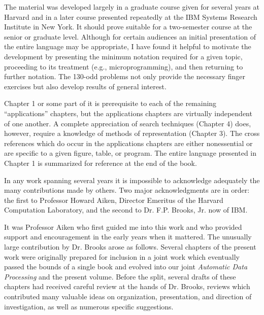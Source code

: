 \par The material was developed largely in a graduate course given for several years at Harvard and in a later course presented repeatedly at the IBM Systems Research Institute in New York. It should prove suitable for a two-semester course at the senior or graduate level. Although for certain audiences an initial presentation of the entire language may be appropriate, I have found it helpful to motivate the development by presenting the minimum notation required for a given topic, proceeding to its treatment (e.g., microprogramming), and then returning to further notation. The 130-odd problems not only provide the necessary finger exercises but also develop results of general interest.

\par Chapter 1 or some part of it is prerequisite to each of the remaining ``applications'' chapters, but the applications chapters are virtually independent of one another. A complete appreciation of search techniques (Chapter 4) does, however, require a knowledge of methods of representation (Chapter 3). The cross references which do occur in the applications chapters are either nonessential or are specific to a given figure, table, or program. The entire language presented in Chapter 1 is summarized for reference at the end of the book.

\par In any work spanning several years it is impossible to acknowledge adequately the many contributions made by others. Two major acknowledgments are in order: the first to Professor Howard Aiken, Director Emeritus of the Harvard Computation Laboratory, and the second to Dr. F.P. Brooks, Jr. now of IBM.

\par It was Professor Aiken who first guided me into this work and who provided support and encouragement in the early years when it mattered. The unusually large contribution by Dr. Brooks arose as follows. Several chapters of the present work were originally prepared for inclusion in a joint work which eventually passed the bounds of a single book and evolved into our joint \textit{Automatic Data Processing} and the present volume. Before the split, several drafts of these chapters had received careful review at the hands of Dr. Brooks, reviews which contributed many valuable ideas on organization, presentation, and direction of investigation, as well as numerous specific suggestions.

